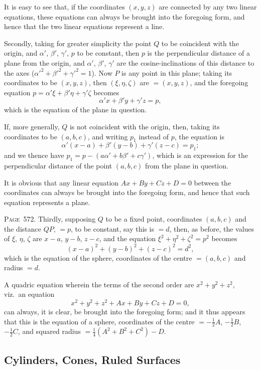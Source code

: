 \documentclass[11pt,a4paper]{article}
\theoremstyle{definition}
\begin{document}
It is easy to see that, if the coordinates $(x,y,z)$ are connected by any two linear equations, these equations can always be brought into the foregoing form, and hence that the two linear equations represent a line.

Secondly, taking for greater simplicity the point $Q$ to be coincident with the origin, and $\alpha'$, $\beta'$, $\gamma'$, $p$ to be constant, then $p$ is the perpendicular distance of a plane from the origin, and $\alpha'$, $\beta'$, $\gamma'$ are the cosine-inclinations of this distance to the axes ($\alpha'^2+\beta'^2+\gamma'^2=1$). Now $P$ is any point in this plane; taking its coordinates to be $(x,y,z)$, then $(\xi,\eta,\zeta)$ are $=(x,y,z)$, and the foregoing equation $p=\alpha'\xi+\beta'\eta+\gamma'\zeta$ becomes
\[
\alpha' x+\beta' y+\gamma' z=p,
\]
which is the equation of the plane in question.

If, more generally, $Q$ is not coincident with the origin, then, taking its coordinates to be $(a,b,c)$, and writing $p_1$ instead of $p$, the equation is
\[
\alpha'(x-a)+\beta'(y-b)+\gamma'(z-c)=p_1;
\]
and we thence have $p_1=p-(a\alpha'+b\beta'+c\gamma')$, which is an expression for the perpendicular distance of the point $(a,b,c)$ from the plane in question.

It is obvious that any linear equation $Ax+By+Cz+D=0$ between the coordinates can always be brought into the foregoing form, and hence that such equation represents a plane.

\newpage
\noindent\textsc{Page~572.} Thirdly, supposing $Q$ to be a fixed point, coordinates $(a,b,c)$ and the distance $QP$, $=p$, to be constant, say this is $=d$, then, as before, the values of $\xi$, $\eta$, $\zeta$ are $x-a$, $y-b$, $z-c$, and the equation $\xi^2+\eta^2+\zeta^2=p^2$ becomes
\[
(x-a)^2+(y-b)^2+(z-c)^2=d^2,
\]
which is the equation of the sphere, coordinates of the centre $=(a,b,c)$ and radius $=d$.

A quadric equation wherein the terms of the second order are $x^2+y^2+z^2$, viz.\ an equation
\[
x^2+y^2+z^2+Ax+By+Cz+D=0,
\]
can always, it is clear, be brought into the foregoing form; and it thus appears that this is the equation of a sphere, coordinates of the centre $=-\tfrac12A$, $-\tfrac12B$, $-\tfrac12C$, and squared radius $=\tfrac14(A^2+B^2+C^2)-D$.

\subsection*{Cylinders, Cones, Ruled Surfaces}
\end{document}
